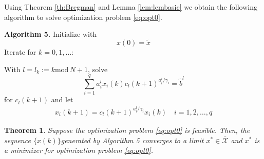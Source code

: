 \documentclass[twocolumn]{article}
\newtheorem{theorem}{Theorem}
\newtheorem{remark}{Remark}
\begin{document}



 Using Theorem \ref{th:Bregman} and Lemma \ref{lem:lembasic} we obtain the following  algorithm to solve
 optimization problem \eqref{eq:opt0}.



{\bf Algorithm 5.}
Initialize with
\begin{equation}
\label{eq:x0}
x(0)=\tilde{x}
\end{equation}
Iterate for $k=0,1,\dots $:
 
With
$
l= l_k :=  k\text{mod}\, N +1$, solve 
\begin{equation}
\label{eq:c1i2}
 \sum_{i=1}^q a^{l}_i x_i(k)  c_{l}(k+1)^{a^l_i/\gamma_i}= \tilde{b}^{l}
\end{equation}
for $c_l(k+1)$
and let
\begin{align}
\label{eq:genAl1}
x_i(k+1) =  c_{l}(k+1)^{a^l_i/\gamma_i} x_i(k) 	\quad i=1,2,\dots, q	
\end{align}


\begin{theorem}
\label{th:Genal}
Suppose the optimization problem \eqref{eq:opt0} is feasible.
Then, the sequence $\{x(k)\}$generated by Algorithm 5  converges to a limit $x^* \in \bar{\mathcal X}$ and  $x^*$
is a minimizer for  optimization problem \eqref{eq:opt0}.
\end{theorem}
\end{document}
